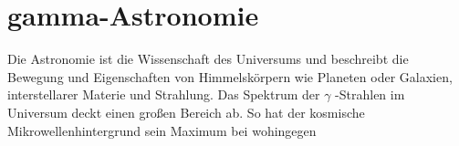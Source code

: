 \chapter{gamma-Astronomie}
Die Astronomie ist die Wissenschaft des Universums und beschreibt die Bewegung und Eigenschaften von Himmelskörpern wie Planeten oder Galaxien, interstellarer Materie und Strahlung. Das Spektrum der $\gamma$ -Strahlen im Universum deckt einen großen Bereich ab. So hat der kosmische Mikrowellenhintergrund sein Maximum bei wohingegen

